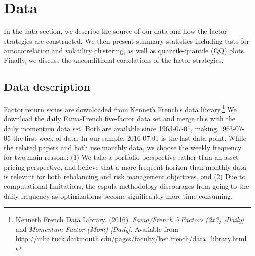\section{Data}
\label{sec:data}
In the data section, we describe the source of our data and how the factor strategies are constructed. We then present summary statistics including tests for autocorrelation and volatility clustering, as well as quantile-quantile (QQ) plots. Finally, we discuss the unconditional correlations of the factor strategies.

\subsection{Data description}

Factor return series are downloaded from Kenneth French's data library.\footnote{Kenneth French Data Library. (2016). \textit{Fama/French 5 Factors (2x3) [Daily]} and \textit{Momentum Factor (Mom) [Daily]}. Available from: \url{http://mba.tuck.dartmouth.edu/pages/faculty/ken.french/data_library.html}} We download the daily Fama-French five-factor data set and merge this with the daily momentum data set. Both are available since 1963-07-01, making 1963-07-05 the first week of data. In our sample, 2016-07-01 is the last data point. While the related papers \textcite{FF2015} and \textcite{Asness2015} both use monthly data, we choose the weekly frequency for two main reasons: (1) We take a portfolio perspective rather than an asset pricing perspective, and believe that a more frequent horizon than monthly data is relevant for both rebalancing and risk management objectives, and (2) Due to computational limitations, the copula methodology discourages from going to the daily frequency as optimizations become significantly more time-consuming.

